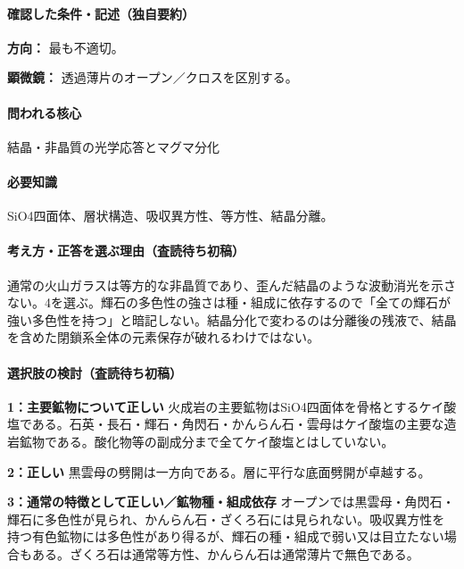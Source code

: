 \paragraph{確認した条件・記述（独自要約）}\mbox{}\par

\noindent\textbf{方向：} 最も不適切。\par

\noindent\textbf{顕微鏡：} 透過薄片のオープン／クロスを区別する。\par

\paragraph{問われる核心} 結晶・非晶質の光学応答とマグマ分化

\paragraph{必要知識} SiO4四面体、層状構造、吸収異方性、等方性、結晶分離。

\paragraph{考え方・正答を選ぶ理由（査読待ち初稿）} 通常の火山ガラスは等方的な非晶質であり、歪んだ結晶のような波動消光を示さない。4を選ぶ。輝石の多色性の強さは種・組成に依存するので「全ての輝石が強い多色性を持つ」と暗記しない。結晶分化で変わるのは分離後の残液で、結晶を含めた閉鎖系全体の元素保存が破れるわけではない。

\paragraph{選択肢の検討（査読待ち初稿）}\mbox{}\par

\noindent\textbf{1：主要鉱物について正しい} 火成岩の主要鉱物はSiO4四面体を骨格とするケイ酸塩である。石英・長石・輝石・角閃石・かんらん石・雲母はケイ酸塩の主要な造岩鉱物である。酸化物等の副成分まで全てケイ酸塩とはしていない。\par

\noindent\textbf{2：正しい} 黒雲母の劈開は一方向である。層に平行な底面劈開が卓越する。\par

\noindent\textbf{3：通常の特徴として正しい／鉱物種・組成依存} オープンでは黒雲母・角閃石・輝石に多色性が見られ、かんらん石・ざくろ石には見られない。吸収異方性を持つ有色鉱物には多色性があり得るが、輝石の種・組成で弱い又は目立たない場合もある。ざくろ石は通常等方性、かんらん石は通常薄片で無色である。\par

